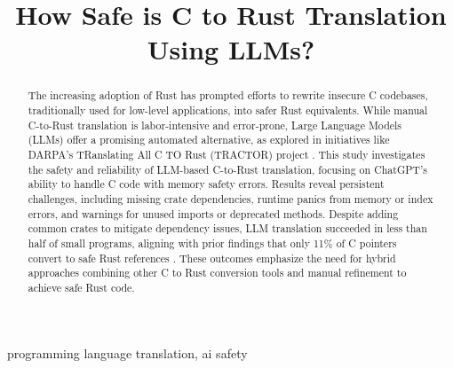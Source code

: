 \documentclass[conference]{IEEEtran}
\begin{document}
\title{How Safe is C to Rust Translation Using LLMs?}

\author{
\and
{}
}

\maketitle

\begin{abstract}
The increasing adoption of Rust has prompted efforts to rewrite insecure C codebases, traditionally used for low-level applications, into safer Rust equivalents. While manual C-to-Rust translation is labor-intensive and
error-prone, Large Language Models (LLMs) offer a promising automated alternative, as explored in
initiatives like DARPA’s TRanslating All C TO Rust (TRACTOR) project \cite{darpa_c_to_rust}. This study investigates
the safety and reliability of LLM-based C-to-Rust translation, focusing on ChatGPT’s ability to
handle C code with memory safety errors. Results reveal persistent challenges, including missing crate dependencies, runtime panics from memory or index errors, and warnings for unused imports or
deprecated methods. Despite adding common crates to mitigate dependency issues, LLM translation
succeeded in less than half of small programs, aligning with prior findings that only 11\% of C
pointers convert to safe Rust references \cite{emre2023aliasing}. These outcomes emphasize the need for hybrid approaches
combining other C to Rust conversion tools and manual refinement to achieve safe Rust code.
\end{abstract}

\begin{IEEEkeywords}
programming language translation, ai safety
\end{IEEEkeywords}
\end{document}

